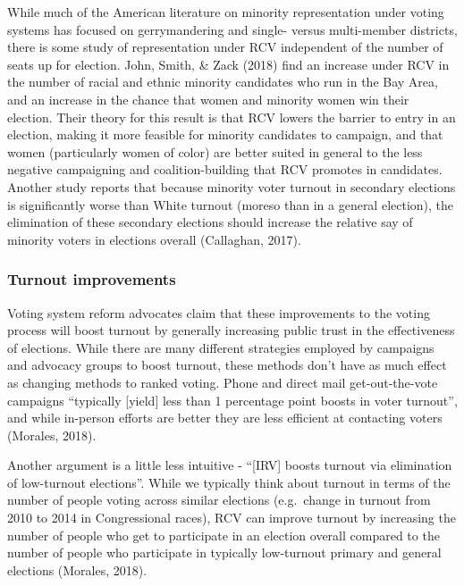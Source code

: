 \documentclass[12pt,twoside]{reedthesis}
\begin{document}
While much of the American literature on minority representation under voting systems has focused on gerrymandering and single- versus multi-member districts, there is some study of representation under RCV independent of the number of seats up for election. John, Smith, \& Zack (2018) find an increase under RCV in the number of racial and ethnic minority candidates who run in the Bay Area, and an increase in the chance that women and minority women win their election. Their theory for this result is that RCV lowers the barrier to entry in an election, making it more feasible for minority candidates to campaign, and that women (particularly women of color) are better suited in general to the less negative campaigning and coalition-building that RCV promotes in candidates. Another study reports that because minority voter turnout in secondary elections is significantly worse than White turnout (moreso than in a general election), the elimination of these secondary elections should increase the relative say of minority voters in elections overall (Callaghan, 2017).

\hypertarget{turnout-improvements}{%
\subsubsection{Turnout improvements}\label{turnout-improvements}}

Voting system reform advocates claim that these improvements to the voting process will boost turnout by generally increasing public trust in the effectiveness of elections. While there are many different strategies employed by campaigns and advocacy groups to boost turnout, these methods don't have as much effect as changing methods to ranked voting. Phone and direct mail get-out-the-vote campaigns ``typically {[}yield{]} less than 1 percentage point boosts in voter turnout'', and while in-person efforts are better they are less efficient at contacting voters (Morales, 2018).

Another argument is a little less intuitive - ``{[}IRV{]} boosts turnout via elimination of low-turnout elections''. While we typically think about turnout in terms of the number of people voting across similar elections (e.g.~change in turnout from 2010 to 2014 in Congressional races), RCV can improve turnout by increasing the number of people who get to participate in an election overall compared to the number of people who participate in typically low-turnout primary and general elections (Morales, 2018).
\end{document}
